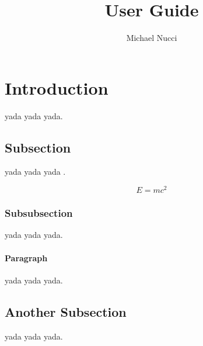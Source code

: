 \documentclass{article}
\begin{document}
\title{User Guide}
\author{Michael Nucci}

\maketitle
\section{Introduction}

yada yada yada.

\subsection{Subsection}

yada yada yada \cite{LastName}.

\begin{equation}
E = m c^2
\label{eqn:relativity}
\end{equation}

\subsubsection{Subsubsection}

yada yada yada.

\paragraph{Paragraph}

yada yada yada. 

\subsection{Another Subsection}\label{sec:subsection}

yada yada yada.

\clearpage



\end{document}
